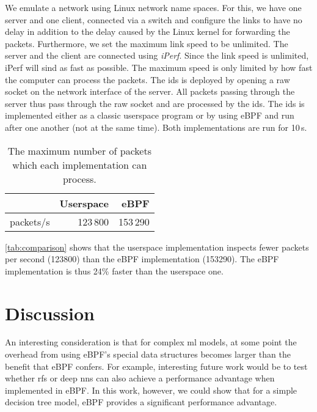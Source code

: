 \documentclass[conference]{IEEEtran}
\begin{document}
We emulate a network using Linux network name spaces. For this, we have one server and one client, connected via a switch and configure the links to have no delay in addition to the delay caused by the Linux kernel for forwarding the packets. Furthermore, we set the maximum link speed to be unlimited. The server and the client are connected using \textit{iPerf}. Since the link speed is unlimited, iPerf will sind as fast as possible. The maximum speed is only limited by how fast the computer can process the packets. The \gls{ids} is deployed by opening a raw socket on the network interface of the server. All packets passing through the server thus pass through the raw socket and are processed by the \gls{ids}. The \gls{ids} is implemented either as a classic userspace program or by using eBPF and run after one another (not at the same time). Both implementations are run for 10\,s. 

\begin{table}[h]
\caption{The maximum number of packets which each implementation can process.} \label{tab:comparison}
\centering
\begin{tabular}{rrr} \toprule
& Userspace & eBPF \\ \midrule
packets/s & 123\,800 & 153\,290 \\
\bottomrule
\end{tabular}
\end{table}


\autoref{tab:comparison} shows that the userspace implementation inspects fewer packets per second (123800) than the eBPF implementation (153290). The eBPF implementation is thus 24\% faster than the userspace one. 

\section{Discussion}

An interesting consideration is that for complex \gls{ml} models, at some point the overhead from using eBPF's special data structures becomes larger than the benefit that eBPF confers. For example, interesting future work would be to test whether \glspl{rf} or deep \glspl{nn} can also achieve a performance advantage when implemented in eBPF. In this work, however, we could show that for a simple decision tree model, eBPF provides a significant performance advantage. 


\renewcommand*{\bibfont}{\small}


\end{document}
